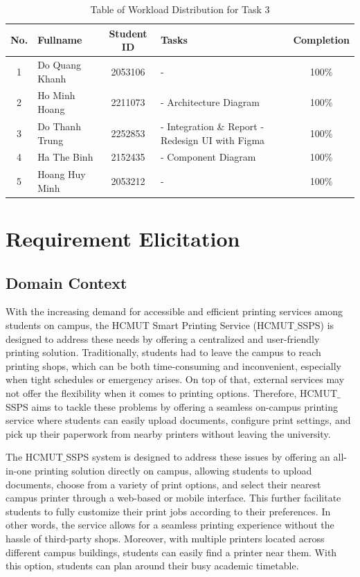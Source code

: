 \documentclass[a4paper]{report}
\begin{document}
\begin{table}[H]
\renewcommand{\arraystretch}{1.8}
\centering
\begin{tabular}{|c|p{3cm}|c|p{6cm}|c|}
\hline
\textbf{No.} & \textbf{Fullname} & \textbf{Student ID} & \textbf{Tasks} & \textbf{Completion} \\
\hline
1 & Do Quang Khanh & 2053106 & - & 100\% \\
\hline
2 & Ho Minh Hoang & 2211073 & - Architecture Diagram & 100\% \\
\hline
3 & Do Thanh Trung & 2252853 & - Integration \& Report \newline - Redesign UI with Figma & 100\% \\
\hline
4 & Ha The Binh      & 2152435   & - Component Diagram & 100\% \\
\hline
5 & Hoang Huy Minh   & 2053212   & -& 100\% \\
\hline
\end{tabular}
\caption{Table of Workload Distribution for Task 3}
\end{table}



\newpage


\chapter{Requirement Elicitation}

\section{Domain Context}
With the increasing demand for accessible and efficient printing services among students on campus, the HCMUT Smart Printing Service (HCMUT$\_$SSPS) is designed to address these needs by offering a centralized and user-friendly printing solution. Traditionally, students had to leave the campus to reach printing shops, which can be both time-consuming and inconvenient, especially when tight schedules or emergency arises. On top of that, external services may not offer the flexibility when it comes to printing options. Therefore, HCMUT$\_$SSPS aims to tackle these problems by offering a seamless on-campus printing service where students can easily upload documents, configure print settings, and pick up their paperwork from nearby printers without leaving the university.

The HCMUT$\_$SSPS system is designed to address these issues by offering an all-in-one printing solution directly on campus, allowing students to upload documents, choose from a variety of print options, and select their nearest campus printer through a web-based or mobile interface. This further facilitate students to fully customize their print jobs according to their preferences. In other words, the service allows for a seamless printing experience without the hassle of third-party shops. Moreover, with multiple printers located across different campus buildings, students can easily find a printer near them. With this option, students can plan around their busy academic timetable.
\end{document}
